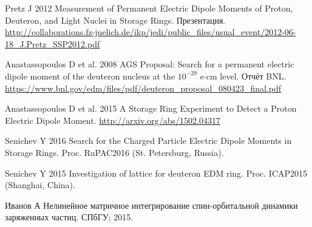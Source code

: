 \documentclass{article}
\begin{document}
	\begin{thebibliography}{99}
		Pretz J 2012 Measurement of Permanent Electric Dipole Moments of Proton, Deuteron, and Light Nuclei in Storage Rings. Презентация. \url{http://collaborations.fz-juelich.de/ikp/jedi/public_files/usual_event/2012-06-18_J.Pretz_SSP2012.pdf}
		
		Anastassopoulos D et al. 2008 AGS Proposal: Search for a permanent electric dipole moment of the deuteron nucleus at the $10^{-29}$ e$\cdot$cm level. Отчёт BNL. \url{https://www.bnl.gov/edm/files/pdf/deuteron_proposal_080423_final.pdf}
		
		Anastassopoulos D et al. 2015 A Storage Ring Experiment to Detect a Proton Electric Dipole Moment. \url{http://arxiv.org/abs/1502.04317}
		
		Senichev Y 2016 Search for the Charged Particle Electric Dipole Moments in Storage Rings. Proc. RuPAC2016 (St. Petersburg, Russia).
		
		Senichev Y 2015 Investigation of lattice for deuteron EDM ring. Proc. ICAP2015 (Shanghai, China).
		
		Иванов А Нелинейное матричное интегрирование спин-орбитальной динамики заряженных частиц. СПбГУ; 2015.
	\end{thebibliography}
\end{document}
